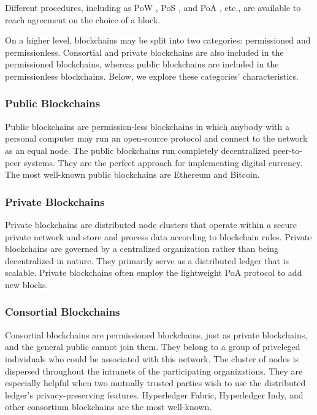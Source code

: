  \vspace{.5cm}
 
Different procedures, including as \ac{PoW} \cite{pow}, \ac{PoS} \cite{pos}, and \ac{PoA} \cite{poa}, etc., are available to reach agreement on the choice of a block.
 
\vspace{.5cm}
 
On a higher level, blockchains may be split into two categories: permissioned and permissionless. Consortial and private blockchains are also included in the permissioned blockchains, whereas public blockchains are included in the permissionless blockchains. Below, we explore these categories' characteristics.

\subsubsection{Public Blockchains}

Public blockchains are permission-less blockchains in which anybody with a personal computer may run an open-source protocol and connect to the network as an equal node. The public blockchains run completely decentralized peer-to-peer systems. They are the perfect approach for implementing digital currency. The most well-known public blockchains are Ethereum and Bitcoin.

\subsubsection{Private Blockchains}

Private blockchains are distributed node clusters that operate within a secure private network and store and process data according to blockchain rules. Private blockchains are governed by a centralized organization rather than being decentralized in nature. They primarily serve as a distributed ledger that is scalable. Private blockchains often employ the lightweight \ac{PoA} protocol to add new blocks.

\subsubsection{Consortial Blockchains}

Consortial blockchains are permissioned blockchains, just as private blockchains, and the general public cannot join them. They belong to a group of priveleged individuals who could be associated with this network. The cluster of nodes is dispersed throughout the intranets of the participating organizations. They are especially helpful when two mutually trusted parties wish to use the distributed ledger's privacy-preserving features. Hyperledger Fabric, Hyperledger Indy, and other consortium blockchains are the most well-known.


